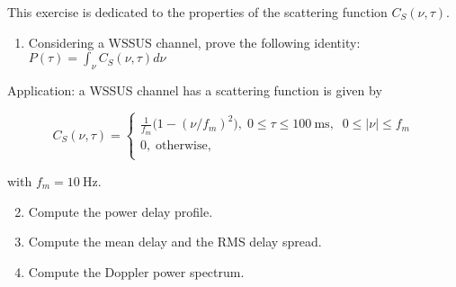 \documentclass [a4paper, 11pt] {article}
\begin{document}
    \pagebreak
   \begin{exercise}{2}
       This exercise is dedicated to the properties of the scattering function $C_S(\nu, \tau)$.

        \begin{enumerate}
            \item Considering a WSSUS channel, prove the following identity: $P(\tau) = \int_{\nu} C_S(\nu, \tau) d\nu$
        \end{enumerate}
        
        Application: a WSSUS channel has a scattering function is given by
        
        \begin{equation}
             C_S(\nu, \tau) =\left\{
                        \begin{array}{ll}
                          \frac{1}{f_m}\big(1-(\nu/f_m)^2\big), \; 0 \leq \tau \leq \SI{100}{\milli\second}, \; \;  0 \leq |\nu| \leq f_m\\
                          0, \; \text{otherwise}, \\
                        \end{array}
                      \right.
        \end{equation}
        
        
        with $f_m = \SI{10}{\hertz}$.
        
        \begin{enumerate}
            \setcounter{enumi}{1}
            \item Compute the power delay profile.
            \item Compute the mean delay and the RMS delay spread.
            \item Compute the Doppler power spectrum.
        \end{enumerate} 
   \end{exercise}
   
\end{document}

